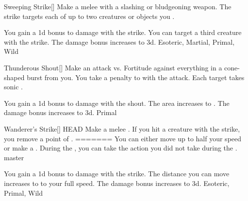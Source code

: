 \lowercase{\hypertarget{maneuver:Sweeping Strike}{}}\label{maneuver:Sweeping Strike}
\hypertarget{maneuver:Sweeping Strike}{}
\begin{freeability}{Sweeping Strike}[]
Make a melee  with a slashing or bludgeoning weapon.
The strike targets each of up to two creatures or objects you .

\rankline
{} You gain a \plus1d bonus to damage with the strike.
 You can target a third creature with the strike.
 The damage bonus increases to \plus3d.
 Esoteric, Martial, Primal, Wild
\end{freeability}
\vspace{0.25em}



\lowercase{\hypertarget{maneuver:Thunderous Shout}{}}\label{maneuver:Thunderous Shout}
\hypertarget{maneuver:Thunderous Shout}{}
\begin{freeability}{Thunderous Shout}[]
Make an attack vs. Fortitude against everything in a \areamed cone-shaped burst from you.
You take a  penalty to  with the attack.
\hit Each target takes sonic .

\rankline
{} You gain a \plus1d bonus to damage with the shout.
 The area increases to \arealarge.
 The damage bonus increases to \plus3d.
 Primal
\end{freeability}
\vspace{0.25em}



\lowercase{\hypertarget{maneuver:Wanderer's Strike}{}}\label{maneuver:Wanderer's Strike}
\hypertarget{maneuver:Wanderer's Strike}{}
\begin{freeability}{Wanderer's Strike}[]
{{{{{{{ HEAD
Make a melee .
If you hit a creature with the strike, you remove a point of .
=======
You can either move up to half your speed or make a .
During the , you can take the action you did not take during the .
}}}}}}} master

\rankline
{} You gain a \plus1d bonus to damage with the strike.
 The distance you can move increases to to your full speed.
 The damage bonus increases to \plus3d.
 Esoteric, Primal, Wild
\end{freeability}
\vspace{0.25em}



